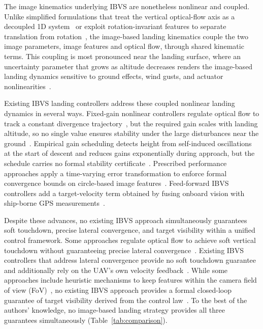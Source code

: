 \documentclass{IEEEtaes}
\begin{document}
The image kinematics underlying IBVS are nonetheless nonlinear and coupled. Unlike simplified formulations that treat the vertical optical-flow axis as a decoupled 1D system~\cite{herisse2012} or exploit rotation-invariant features to separate translation from rotation~\cite{lin2023}, the image-based landing kinematics couple the two image parameters, image features and optical flow, through shared kinematic terms. This coupling is most pronounced near the landing surface, where an uncertainty parameter that grows as altitude decreases renders the image-based landing dynamics sensitive to ground effects, wind gusts, and actuator nonlinearities~\cite{herisse2012,ho2018}.

Existing IBVS landing controllers address these coupled nonlinear landing dynamics in several ways. Fixed-gain nonlinear controllers regulate optical flow to track a constant divergence trajectory~\cite{herisse2012}, but the required gain scales with landing altitude, so no single value ensures stability under the large disturbances near the ground~\cite{ho2018}. Empirical gain scheduling detects height from self-induced oscillations at the start of descent and reduces gains exponentially during approach, but the schedule carries no formal stability certificate~\cite{ho2018}. Prescribed performance approaches apply a time-varying error transformation to enforce formal convergence bounds on circle-based image features~\cite{lin2023}. Feed-forward IBVS controllers add a target-velocity term obtained by fusing onboard vision with ship-borne GPS measurements~\cite{cho2022}.

Despite these advances, no existing IBVS approach simultaneously guarantees soft touchdown, precise lateral convergence, and target visibility within a unified control framework. Some approaches regulate optical flow to achieve soft vertical touchdown without guaranteeing precise lateral convergence~\cite{herisse2012,ho2018}. Existing IBVS controllers that address lateral convergence provide no soft touchdown guarantee and additionally rely on the UAV's own velocity feedback~\cite{lin2023,cho2022}. While some approaches include heuristic mechanisms to keep features within the camera field of view (FoV)~\cite{cho2022,angelis2026}, no existing IBVS approach provides a formal closed-loop guarantee of target visibility derived from the control law~\cite{lin2023,cho2022,herisse2012,ho2018}. To the best of the authors' knowledge, no image-based landing strategy provides all three guarantees simultaneously (Table~\ref{tab:comparison}).
\end{document}
